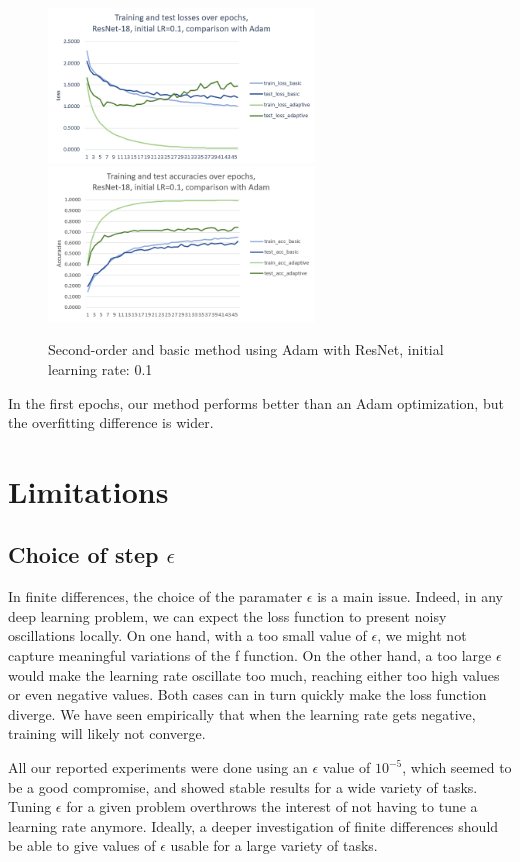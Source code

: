 \documentclass{article}
\begin{document}
  \begin{figure}[!h]
  	\includegraphics[width=200pt]{loss_resnet_adam_0_1.png}
  	\includegraphics[width=200pt]{acc_resnet_adam_0_1.png}
  	\caption{Second-order and basic method using Adam with ResNet, initial learning rate: 0.1}
  \end{figure}

  In the first epochs, our method performs better than an Adam optimization, but the overfitting difference is wider. 

  
  \section{Limitations}
  
  \subsection{Choice of step $\epsilon$}
  
  In finite differences, the choice of the paramater $\epsilon$ is a main issue. Indeed, in any deep learning problem, we can expect the loss function to present noisy oscillations locally. On one hand, with a too small value of $\epsilon$, we might not capture meaningful variations of the f function. On the other hand, a too large $\epsilon$ would make the learning rate oscillate too much, reaching either too high values or even negative values. Both cases can in turn quickly make the loss function diverge. We have seen empirically that when the learning rate gets negative, training will likely not converge. 
  
  All our reported experiments were done using an $\epsilon$ value of $10^{-5}$, which seemed to be a good compromise, and showed stable results for a wide variety of tasks. Tuning $\epsilon$ for a given problem overthrows the interest of not having to tune a learning rate anymore. Ideally, a deeper investigation of finite differences should be able to give values of $\epsilon$ usable for a large variety of tasks. 
  
\end{document}
